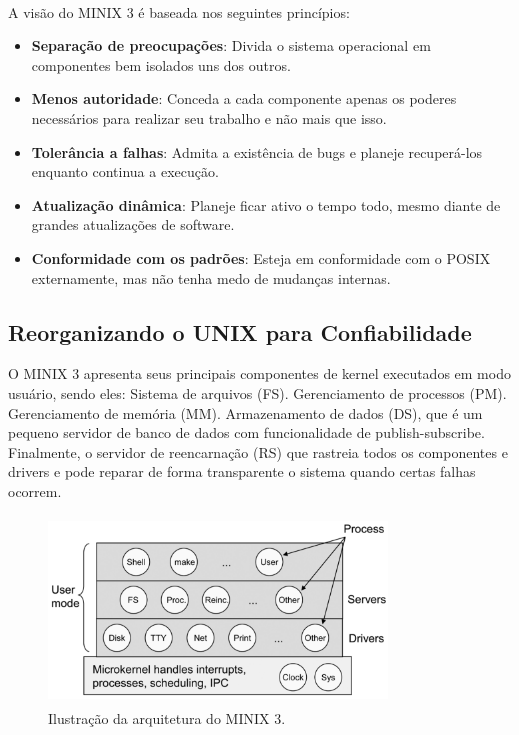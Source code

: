 \documentclass[runningheads]{llncs}
\begin{document}
\paragraph*{}A visão do MINIX 3 é baseada nos seguintes princípios:
\begin{itemize}
\item \textbf{Separação de preocupações}: Divida o sistema operacional em componentes bem isolados uns dos outros.
\item \textbf{Menos autoridade}: Conceda a cada componente apenas os poderes necessários para realizar seu trabalho e não mais que isso.
\item \textbf{Tolerância a falhas}: Admita a existência de bugs e planeje recuperá-los enquanto continua a execução.
\item \textbf{Atualização dinâmica}: Planeje ficar ativo o tempo todo, mesmo diante de grandes atualizações de software.
\item \textbf{Conformidade com os padrões}: Esteja em conformidade com o POSIX externamente, mas não tenha medo de mudanças internas.
\end{itemize}

\subsection{Reorganizando o UNIX para Confiabilidade}O MINIX 3 apresenta seus principais componentes de kernel executados em modo usuário, sendo eles: Sistema de arquivos (FS). Gerenciamento de processos (PM). Gerenciamento de memória (MM). Armazenamento de dados (DS), que é um pequeno servidor de banco de dados com funcionalidade de publish-subscribe. Finalmente, o servidor de reencarnação (RS) que rastreia todos os componentes e drivers e pode reparar de forma transparente o sistema quando certas falhas ocorrem.

\begin{figure}[h]
    \centering
    \includegraphics[width=9cm, height=5cm]{MINIX ARCH.png}
    \caption{Ilustração da arquitetura do MINIX 3.}
\end{figure}
\end{document}
